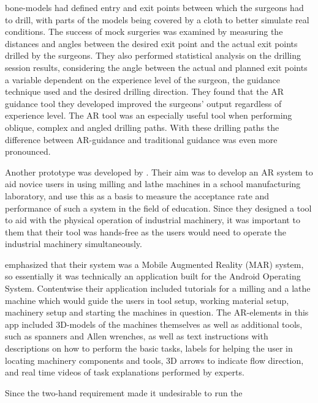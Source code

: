 bone-models had defined entry and exit points between which the surgeons had 
to drill, with parts of the models being covered by a cloth to better 
simulate real conditions.\cite{VanGestel2024} The success of mock surgeries 
was examined by measuring the distances and angles between the desired exit 
point and the actual exit points drilled by the surgeons.\cite{VanGestel2024} 
They also performed statistical analysis on the drilling session results, 
considering the angle between the actual and planned exit points a variable 
dependent on the experience level of the surgeon, the guidance technique used 
and the desired drilling direction.\cite{VanGestel2024} They found that the 
AR guidance tool they developed improved the surgeons' output regardless of 
experience level.\cite{VanGestel2024} The AR tool was an especially useful 
tool when performing oblique, complex and angled drilling paths. With these 
drilling paths the difference between AR-guidance and traditional guidance was 
even more pronounced.\cite{VanGestel2024}\par
	Another prototype was developed by \textcite{reyesEtAl2016}. Their aim 
was to develop an AR system to aid novice users in using milling and lathe 
machines in a school manufacturing laboratory, and use this as a basis to 
measure the acceptance rate and performance of such a system in the field of 
education.\cite{reyesEtAl2016} Since they designed a tool to aid with the 
physical operation of industrial machinery, it was important to them that their 
tool was hands-free as the users would need to operate the industrial 
machinery simultaneously.\cite{reyesEtAl2016}\par
	\textcite{reyesEtAl2016} emphasized that their system was a Mobile 
Augmented Reality (MAR) system, so essentially it was technically an 
application built for the Android Operating System. Contentwise their 
application included tutorials for a milling and a lathe machine which would 
guide the users in tool setup, working material setup, machinery setup and 
starting the machines in question.\cite{reyesEtAl2016} The AR-elements in this 
app included 3D-models of the machines themselves as well as additional 
tools, such as spanners and Allen wrenches, as well as text instructions with 
descriptions on how to perform the basic tasks, labels for helping the user 
in locating machinery components and tools, 3D arrows to indicate flow 
direction, and real time videos of task explanations performed by 
experts.\cite{reyesEtAl2016}\par
	Since the two-hand requirement made it undesirable to run the 
